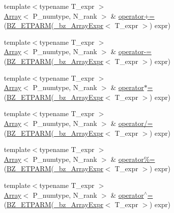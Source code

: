 \begin{DoxyCompactItemize}
\item 
{\footnotesize template$<$typename T\+\_\+expr $>$ }\\\hyperlink{classArray}{Array}$<$ P\+\_\+numtype, N\+\_\+rank $>$ \& \hyperlink{classArray_afe58a752b0dcd626c21f09eb4379d288}{operator+=} (\hyperlink{tuning_8h_a92a6f3aa8f4cd5ac9b4239c449892bb7}{B\+Z\+\_\+\+E\+T\+P\+A\+R\+M}(\hyperlink{class__bz__ArrayExpr}{\+\_\+bz\+\_\+\+Array\+Expr}$<$ T\+\_\+expr $>$) expr)
\item 
{\footnotesize template$<$typename T\+\_\+expr $>$ }\\\hyperlink{classArray}{Array}$<$ P\+\_\+numtype, N\+\_\+rank $>$ \& \hyperlink{classArray_a428b6e6da4832f3963884d3767edb171}{operator-\/=} (\hyperlink{tuning_8h_a92a6f3aa8f4cd5ac9b4239c449892bb7}{B\+Z\+\_\+\+E\+T\+P\+A\+R\+M}(\hyperlink{class__bz__ArrayExpr}{\+\_\+bz\+\_\+\+Array\+Expr}$<$ T\+\_\+expr $>$) expr)
\item 
{\footnotesize template$<$typename T\+\_\+expr $>$ }\\\hyperlink{classArray}{Array}$<$ P\+\_\+numtype, N\+\_\+rank $>$ \& \hyperlink{classArray_a92ad2ac2d9be5d42c2d1012d1ac2cc60}{operator$\ast$=} (\hyperlink{tuning_8h_a92a6f3aa8f4cd5ac9b4239c449892bb7}{B\+Z\+\_\+\+E\+T\+P\+A\+R\+M}(\hyperlink{class__bz__ArrayExpr}{\+\_\+bz\+\_\+\+Array\+Expr}$<$ T\+\_\+expr $>$) expr)
\item 
{\footnotesize template$<$typename T\+\_\+expr $>$ }\\\hyperlink{classArray}{Array}$<$ P\+\_\+numtype, N\+\_\+rank $>$ \& \hyperlink{classArray_acf9962df41838c86674fcc37fcc23079}{operator/=} (\hyperlink{tuning_8h_a92a6f3aa8f4cd5ac9b4239c449892bb7}{B\+Z\+\_\+\+E\+T\+P\+A\+R\+M}(\hyperlink{class__bz__ArrayExpr}{\+\_\+bz\+\_\+\+Array\+Expr}$<$ T\+\_\+expr $>$) expr)
\item 
{\footnotesize template$<$typename T\+\_\+expr $>$ }\\\hyperlink{classArray}{Array}$<$ P\+\_\+numtype, N\+\_\+rank $>$ \& \hyperlink{classArray_a09eb096154afc16c560cd1c40e77e796}{operator\%=} (\hyperlink{tuning_8h_a92a6f3aa8f4cd5ac9b4239c449892bb7}{B\+Z\+\_\+\+E\+T\+P\+A\+R\+M}(\hyperlink{class__bz__ArrayExpr}{\+\_\+bz\+\_\+\+Array\+Expr}$<$ T\+\_\+expr $>$) expr)
\item 
{\footnotesize template$<$typename T\+\_\+expr $>$ }\\\hyperlink{classArray}{Array}$<$ P\+\_\+numtype, N\+\_\+rank $>$ \& \hyperlink{classArray_a86542ef7d672020b9243e1d17235eaa7}{operator$^\wedge$=} (\hyperlink{tuning_8h_a92a6f3aa8f4cd5ac9b4239c449892bb7}{B\+Z\+\_\+\+E\+T\+P\+A\+R\+M}(\hyperlink{class__bz__ArrayExpr}{\+\_\+bz\+\_\+\+Array\+Expr}$<$ T\+\_\+expr $>$) expr)

\end{DoxyCompactItemize}
